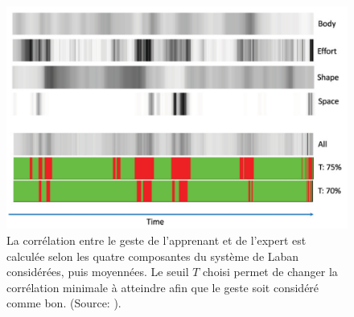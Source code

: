 \begin{figure}
    \centering
    \includegraphics[width=\textwidth]{pictures/correlation_laban_descriptors.png}
    \caption[Corrélation entre le geste de l'apprenant et de l'expert]{La corrélation entre le geste de l'apprenant et de l'expert est calculée selon les quatre composantes du système de Laban considérées, puis moyennées. Le seuil $T$ choisi permet de changer la corrélation minimale à atteindre afin que le geste soit considéré comme bon. (Source: \parencite{Aristidou2015FDE}).}
    \label{fig:correlation_laban_descriptors}
\end{figure}

